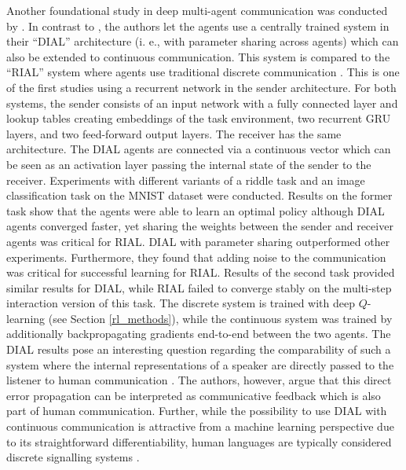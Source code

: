 Another foundational study in deep multi-agent communication was conducted by \cite{foerster2016learning}. In contrast to \cite{lazaridou2016multi}, the authors let the agents use a centrally trained system in their ``DIAL'' architecture (i. e., with parameter sharing across agents)  which can also be extended to continuous communication. This system is compared to the ``RIAL'' system where agents use traditional discrete communication \parencite[][p. 2]{foerster2016learning}. This is one of the first studies using a recurrent network in the sender architecture.
For both systems, the sender consists of an input network with a fully connected layer and lookup tables creating embeddings of the task environment, two recurrent GRU layers, and two feed-forward output layers.
The receiver has the same architecture. The DIAL agents are connected via a continuous vector which can be seen as an activation layer passing the internal state of the sender to the receiver.
Experiments with different variants of a riddle task and an image classification task on the MNIST dataset were conducted. Results on the former task show that the agents were able to learn an optimal policy although DIAL agents converged faster, yet sharing the weights between the sender and receiver agents was critical for RIAL. DIAL with parameter sharing outperformed other experiments. Furthermore, they found that adding noise to the communication was critical for successful learning for RIAL. Results of the second task provided similar results for DIAL, while RIAL failed to converge stably on the multi-step interaction version of this task. 
The discrete system is trained with deep $Q$-learning (see Section \ref{rl_methods}), while the continuous system was trained by additionally backpropagating gradients end-to-end between the two agents. %
The DIAL results pose an interesting question regarding the comparability of such a system where the internal representations of a speaker are directly passed to the listener to human communication \parencite[cf.][]{lazaridou2020emergent, hockett1960origin}. The authors, however, argue that this direct error propagation can be interpreted as communicative feedback which is also part of human communication. Further, while the possibility to use DIAL with continuous communication is attractive from a machine learning perspective due to its straightforward differentiability, human languages are typically considered discrete signalling systems \parencite{hockett1960origin}. 

